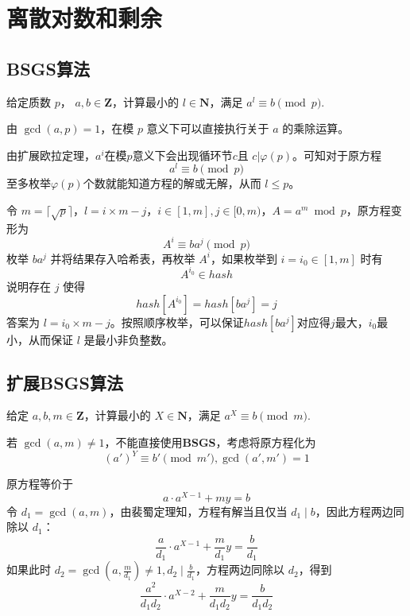 \documentclass[12pt,a4paper]{article}
\begin{document}
\section{离散对数和剩余}
\subsection{BSGS算法}
\begin{mdframed}[leftline=true, linewidth=2pt, linecolor=gray]
	给定质数 $p$， $a,b\in \mathbf{Z}$，计算最小的 $l\in\mathbf{N}$，满足 $a^l \equiv b \pmod p$.
\end{mdframed}

由 $\gcd(a,p)=1$，在模 $p$ 意义下可以直接执行关于 $a$ 的乘除运算。

由扩展欧拉定理，$a^i$在模$p$意义下会出现循环节$c$且 $c|\varphi(p)$。可知对于原方程 \begin{equation*}
	a^l \equiv b \pmod p
\end{equation*}
至多枚举$\varphi(p)$个数就能知道方程的解或无解，从而 $l\leq p$。

令 $m=\lceil\sqrt{p}\rceil$，$l=i\times m-j$，$i\in[1,m],j\in[0,m)$，$A=a^m\bmod{p}$，原方程变形为 \begin{equation*}
	A^i\equiv ba^j\pmod{p}
\end{equation*}
枚举 $ba^j$ 并将结果存入哈希表，再枚举 $A^i$，如果枚举到 $i=i_0\in [1,m]$ 时有 
\begin{equation*}
	A^{i_0}\in hash
\end{equation*}
说明存在 $j$ 使得 \begin{equation*}
	hash[A^{i_0}]=hash[ba^j]=j
\end{equation*}
答案为 $l=i_0\times m-j$。按照顺序枚举，可以保证$hash[ba^j]$对应得$j$最大，$i_0$最小，从而保证 $l$ 是最小非负整数。

\subsection{扩展BSGS算法}
\begin{mdframed}[leftline=true, linewidth=2pt, linecolor=gray]
	给定 $a,b,m\in \mathbf{Z}$，计算最小的 $X\in\mathbf{N}$，满足 $a^X \equiv b \pmod m$.
\end{mdframed}

若 $\gcd(a,m)\ne1$，不能直接使用\textbf{BSGS}，考虑将原方程化为\begin{equation*}
	(a')^{Y}\equiv b'\pmod{m'},\gcd(a',m')=1
\end{equation*}

原方程等价于
\begin{equation*}
	a\cdot a^{X-1}+my=b
\end{equation*}
令 $d_1=\gcd(a,m)$，由裴蜀定理知，方程有解当且仅当 $d_1\mid b$，因此方程两边同除以 $d_1$：
\begin{equation*}
	\displaystyle\frac{a}{d_1}\cdot a^{X-1}+\frac{m}{d_1}y=\frac{b}{d_1}
\end{equation*}
如果此时 $\displaystyle d_2=\gcd(a,\frac{m}{d_1})\neq 1, d_2\mid\frac{b}{d_1}$，方程两边同除以 $d_2$，得到 \begin{equation*}
	\displaystyle\frac{a^2}{d_1d_2}\cdot a^{X-2}+\frac{m}{d_1d_2}y=\frac{b}{d_1d_2}
\end{equation*}
\end{document}
